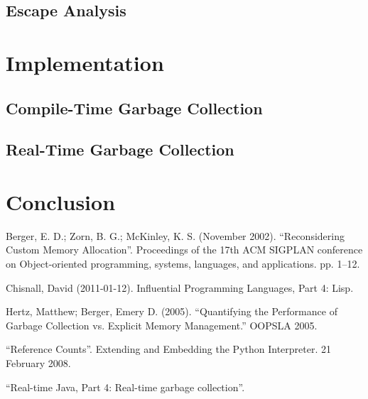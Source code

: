 \documentclass[12pt]{article}
\begin{document}
\subsection{Escape Analysis}

\section{Implementation}
\subsection{Compile-Time Garbage Collection}
\subsection{Real-Time Garbage Collection}

\section{Conclusion}
\newpage
\begin{thebibliography}{}
  Berger, E. D.; Zorn, B. G.; McKinley, K. S. (November 2002). ``Reconsidering Custom Memory Allocation''. Proceedings of the 17th ACM SIGPLAN conference on Object-oriented programming, systems, languages, and applications. pp. 1–12.

  Chisnall, David (2011-01-12). Influential Programming Languages, Part 4: Lisp.
  
  Hertz, Matthew; Berger, Emery D. (2005). ``Quantifying the Performance of Garbage Collection vs. Explicit Memory Management.'' OOPSLA 2005.

  ``Reference Counts''. Extending and Embedding the Python Interpreter. 21 February 2008.

  ``Real-time Java, Part 4: Real-time garbage collection''.
\end{thebibliography}
\end{document}
